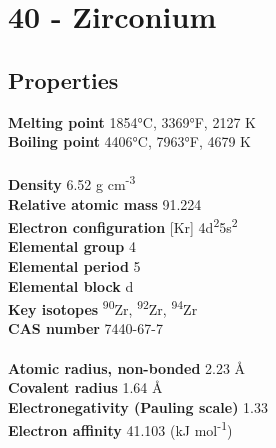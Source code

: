 \section{40 - Zirconium}
\label{sec:elem-zirconium}
\subsection{Properties}
\textbf{Melting point} 1854°C, 3369°F, 2127 K\\
\textbf{Boiling point} 4406°C, 7963°F, 4679 K\\
\\
\textbf{Density} 6.52 g cm\textsuperscript{-3}\\
\textbf{Relative atomic mass} 91.224\\
\textbf{Electron configuration} [Kr] 4d\textsuperscript{2}5s\textsuperscript{2}\\
\textbf{Elemental group} 4\\
\textbf{Elemental period} 5\\
\textbf{Elemental block} d\\
\textbf{Key isotopes} \textsuperscript{90}Zr, \textsuperscript{92}Zr, \textsuperscript{94}Zr\\
\textbf{CAS number} 7440-67-7\\
\\
\textbf{Atomic radius, non-bonded} 2.23 Å\\
\textbf{Covalent radius} 1.64 Å\\
\textbf{Electronegativity (Pauling scale)} 1.33\\
\textbf{Electron affinity} 41.103 (kJ mol\textsuperscript{-1})\\